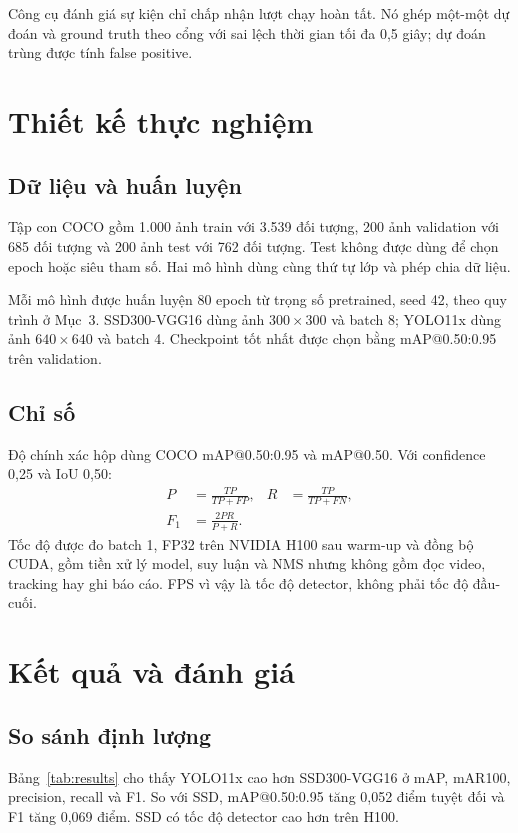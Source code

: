 \documentclass[11pt,a4paper]{article}
\begin{document}
Công cụ đánh giá sự kiện chỉ chấp nhận lượt chạy hoàn tất. Nó ghép một-một dự đoán và ground truth theo cổng với sai lệch thời gian tối đa 0,5 giây; dự đoán trùng được tính false positive.

\section{Thiết kế thực nghiệm}\label{sec:experiments}
\subsection{Dữ liệu và huấn luyện}
Tập con COCO gồm 1.000 ảnh train với 3.539 đối tượng, 200 ảnh validation với 685 đối tượng và 200 ảnh test với 762 đối tượng. Test không được dùng để chọn epoch hoặc siêu tham số. Hai mô hình dùng cùng thứ tự lớp và phép chia dữ liệu.

Mỗi mô hình được huấn luyện 80 epoch từ trọng số pretrained, seed 42, theo quy trình ở Mục~3. SSD300-VGG16 dùng ảnh $300\times300$ và batch 8; YOLO11x dùng ảnh $640\times640$ và batch 4. Checkpoint tốt nhất được chọn bằng mAP@0.50:0.95 trên validation.

\subsection{Chỉ số}
Độ chính xác hộp dùng COCO mAP@0.50:0.95 và mAP@0.50. Với confidence 0,25 và IoU 0,50:
\begin{align}
P&=\frac{TP}{TP+FP}, & R&=\frac{TP}{TP+FN},\\
F_1&=\frac{2PR}{P+R}.&&
\end{align}
Tốc độ được đo batch 1, FP32 trên NVIDIA H100 sau warm-up và đồng bộ CUDA, gồm tiền xử lý model, suy luận và NMS nhưng không gồm đọc video, tracking hay ghi báo cáo. FPS vì vậy là tốc độ detector, không phải tốc độ đầu-cuối.

\section{Kết quả và đánh giá}
\subsection{So sánh định lượng}
Bảng~\ref{tab:results} cho thấy YOLO11x cao hơn SSD300-VGG16 ở mAP, mAR100, precision, recall và F1. So với SSD, mAP@0.50:0.95 tăng 0,052 điểm tuyệt đối và F1 tăng 0,069 điểm. SSD có tốc độ detector cao hơn trên H100.
\end{document}

